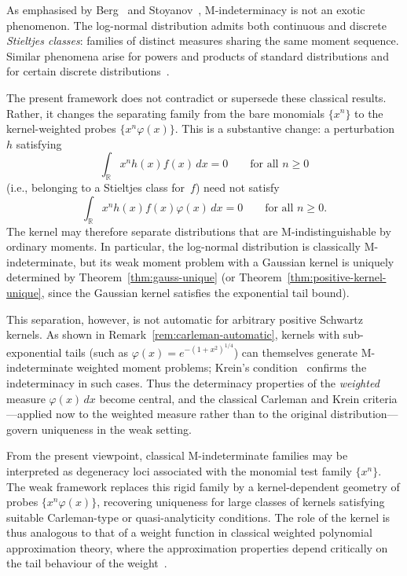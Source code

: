 \documentclass[12pt]{article}
\theoremstyle{definition}
\newcommand{\R}{\mathbb{R}}
\begin{document}
As emphasised by Berg~\cite{Berg1988} and
Stoyanov~\cite{Stoyanov2013}, M-indeterminacy is not an exotic
phenomenon.  The log-normal distribution admits both continuous and
discrete \emph{Stieltjes classes}: families of distinct measures
sharing the same moment sequence.  Similar phenomena arise for powers
and products of standard distributions and for certain discrete
distributions~\cite{LinKopanovStoyanov2020}.

\medskip

The present framework does not contradict or supersede these classical
results.  Rather, it changes the separating family from the bare
monomials $\{x^n\}$ to the kernel-weighted probes
$\{x^n\varphi(x)\}$.  This is a substantive change: a
perturbation~$h$ satisfying
\[
   \int_\R x^n h(x)f(x)\,dx = 0
   \qquad \text{for all } n \geq 0
\]
(i.e., belonging to a Stieltjes class for~$f$) need not satisfy
\[
   \int_\R x^n h(x)f(x)\varphi(x)\,dx = 0
   \qquad \text{for all } n \geq 0.
\]
The kernel may therefore separate distributions that are
M-indistinguishable by ordinary moments.  In particular, the
log-normal distribution is classically M-indeterminate, but its weak
moment problem with a Gaussian kernel is uniquely determined by
Theorem~\ref{thm:gauss-unique} (or
Theorem~\ref{thm:positive-kernel-unique}, since the Gaussian kernel
satisfies the exponential tail bound).

\medskip

This separation, however, is not automatic for arbitrary positive
Schwartz kernels.  As shown in
Remark~\ref{rem:carleman-automatic}, kernels with sub-exponential
tails (such as $\varphi(x) = e^{-(1+x^2)^{1/4}}$) can themselves
generate M-indeterminate weighted moment problems; Krein's
condition~\cite{Stoyanov2000Krein} confirms the indeterminacy in such cases.
Thus the determinacy properties of the \emph{weighted} measure
$\varphi(x)\,dx$ become central, and the classical Carleman and
Krein criteria---applied now to the weighted measure rather than to
the original distribution---govern uniqueness in the weak setting.

From the present viewpoint, classical M-indeterminate families may be
interpreted as degeneracy loci associated with the monomial test
family $\{x^n\}$.  The weak framework replaces this rigid family by a
kernel-dependent geometry of probes $\{x^n\varphi(x)\}$, recovering
uniqueness for large classes of kernels satisfying suitable
Carleman-type or quasi-analyticity conditions.  The role of the
kernel is thus analogous to that of a weight function in classical
weighted polynomial approximation theory, where the approximation
properties depend critically on the tail behaviour of the
weight~\cite{Lubinsky2007}.
\end{document}
